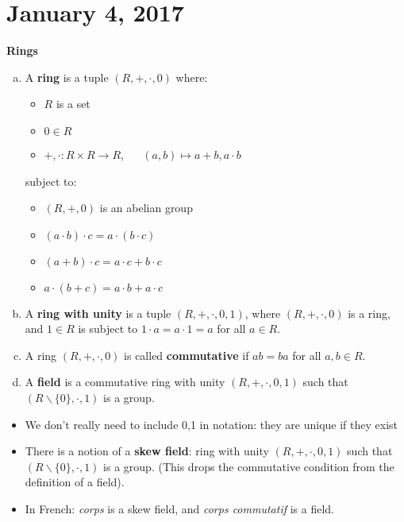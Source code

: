 \section{January 4, 2017} %
\noindent \textbf{Rings}
\begin{defn} \label{Defn 1, Jan 4} \hspace{0.5cm}
    \begin{enumerate}[a)]
    \item A \textbf{ring} is a tuple $(R, +, \cdot, 0)$ where:
    \begin{itemize}
        \item $R$ is a set
        \item $0 \in R$
        \item $+,\cdot: R \times R \rightarrow R$, $\quad$  $(a,b) \mapsto a + b, a \cdot b$
    \end{itemize}
    subject to:
    \begin{itemize}
        \item $(R, +, 0)$ is an abelian group
        \item $(a \cdot b) \cdot c = a \cdot (b \cdot c)$
        \item $(a + b) \cdot c = a \cdot c + b \cdot c$
        \item $a \cdot (b + c) = a \cdot b + a \cdot c$
    \end{itemize}
    \item A \textbf{ring with unity} is a tuple $(R, +, \cdot, 0, 1)$, where
    $(R,+,\cdot,0)$ is a ring, and $1 \in R$ is subject to $1 \cdot a = a \cdot 1 = a$
    for all $a \in R$.
    \item A ring $(R, +, \cdot, 0)$ is called \textbf{commutative} if $ab = ba$ for all
    $a, b \in R$.
    \item A \textbf{field} is a commutative ring with unity $(R,+,\cdot,0,1)$ such
    that $(R \backslash \{0\}, \cdot, 1)$ is a group.
    \end{enumerate}
\end{defn}
\begin{rmk} \hspace{0.5cm}
    \begin{itemize}
        \item We don't really need to include 0,1 in notation: they are unique
        if they exist
        \item There is a notion of a \textbf{skew field}: ring with unity
        $(R,+,\cdot,0,1)$ such that $(R \backslash \{0\}, \cdot , 1)$ is a group.
        (This drops the commutative condition from the definition of a field).
        \item In French: \textit{corps} is a skew field, and \textit{corps commutatif} is a field.
    \end{itemize}
\end{rmk}
